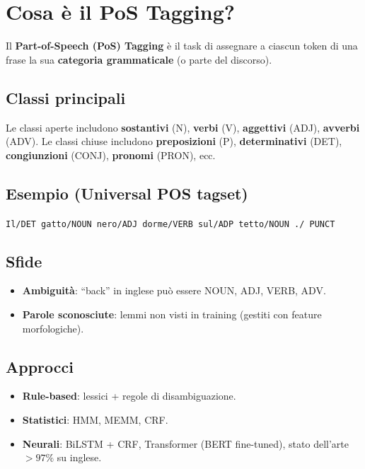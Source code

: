\documentclass[12pt,a4paper]{article}
\begin{document}
\section{Cosa è il PoS Tagging?}

Il \textbf{Part-of-Speech (PoS) Tagging} è il task di assegnare a ciascun token di una frase la sua \textbf{categoria grammaticale} (o parte del discorso).

\subsection{Classi principali}
Le classi aperte includono \textbf{sostantivi} (N), \textbf{verbi} (V), \textbf{aggettivi} (ADJ), \textbf{avverbi} (ADV). Le classi chiuse includono \textbf{preposizioni} (P), \textbf{determinativi} (DET), \textbf{congiunzioni} (CONJ), \textbf{pronomi} (PRON), ecc.

\subsection{Esempio (Universal POS tagset)}
\begin{center}
\texttt{Il/DET gatto/NOUN nero/ADJ dorme/VERB sul/ADP tetto/NOUN ./ PUNCT}
\end{center}

\subsection{Sfide}
\begin{itemize}[leftmargin=1.5em]
  \item \textbf{Ambiguità}: ``back'' in inglese può essere NOUN, ADJ, VERB, ADV.
  \item \textbf{Parole sconosciute}: lemmi non visti in training (gestiti con feature morfologiche).
\end{itemize}

\subsection{Approcci}
\begin{itemize}[leftmargin=1.5em]
  \item \textbf{Rule-based}: lessici + regole di disambiguazione.
  \item \textbf{Statistici}: HMM, MEMM, CRF.
  \item \textbf{Neurali}: BiLSTM + CRF, Transformer (BERT fine-tuned), stato dell'arte $> 97\%$ su inglese.
\end{itemize}
\end{document}
